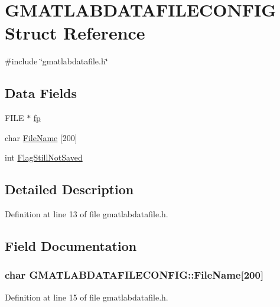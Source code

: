 \hypertarget{structGMATLABDATAFILECONFIG}{
\section{GMATLABDATAFILECONFIG Struct Reference}
\label{structGMATLABDATAFILECONFIG}
}


{\ttfamily \#include \char`\"{}gmatlabdatafile.h\char`\"{}}

\subsection*{Data Fields}
\begin{DoxyCompactItemize}
\item 
FILE $\ast$ \hyperlink{structGMATLABDATAFILECONFIG_a900bde88d01e7b5380101446c89a06a6}{fp}
\item 
char \hyperlink{structGMATLABDATAFILECONFIG_ada4eb3a8fbcfdcb41723f31d09e0bd19}{FileName} \mbox{[}200\mbox{]}
\item 
int \hyperlink{structGMATLABDATAFILECONFIG_a58d1c2a70b22c7c08eccaaea77990db2}{FlagStillNotSaved}
\end{DoxyCompactItemize}


\subsection{Detailed Description}


Definition at line 13 of file gmatlabdatafile.h.



\subsection{Field Documentation}
\hypertarget{structGMATLABDATAFILECONFIG_ada4eb3a8fbcfdcb41723f31d09e0bd19}{
\subsubsection[{FileName}]{\setlength{\rightskip}{0pt plus 5cm}char {\bf GMATLABDATAFILECONFIG::FileName}\mbox{[}200\mbox{]}}}
\label{structGMATLABDATAFILECONFIG_ada4eb3a8fbcfdcb41723f31d09e0bd19}


Definition at line 15 of file gmatlabdatafile.h.



